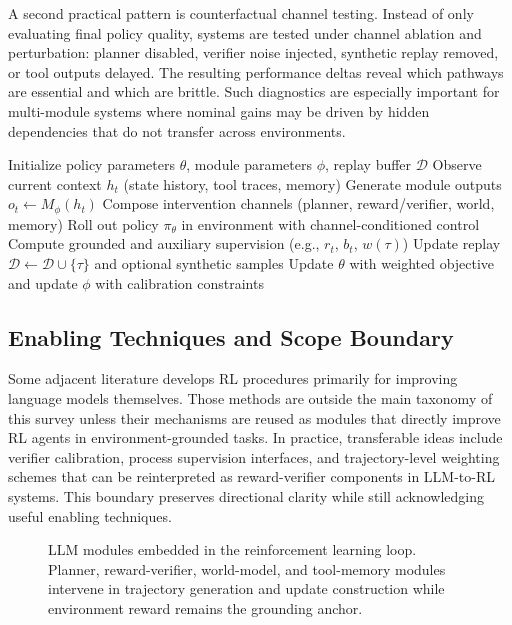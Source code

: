 \documentclass[pdflatex,sn-mathphys-num]{sn-jnl}
\begin{document}
A second practical pattern is counterfactual channel testing. Instead of only evaluating final policy quality, systems are tested under channel ablation and perturbation: planner disabled, verifier noise injected, synthetic replay removed, or tool outputs delayed. The resulting performance deltas reveal which pathways are essential and which are brittle. Such diagnostics are especially important for multi-module systems where nominal gains may be driven by hidden dependencies that do not transfer across environments.

\begin{algorithm}[t]
\caption{Generic LLM-Enhanced RL Loop}
\label{alg:generic_loop}
\begin{algorithmic}[1]
\State Initialize policy parameters $\theta$, module parameters $\phi$, replay buffer $\mathcal{D}$
  \State Observe current context $h_t$ (state history, tool traces, memory)
  \State Generate module outputs $o_t \leftarrow M_{\phi}(h_t)$
  \State Compose intervention channels (planner, reward/verifier, world, memory)
  \State Roll out policy $\pi_{\theta}$ in environment with channel-conditioned control
  \State Compute grounded and auxiliary supervision (e.g., $r_t$, $b_t$, $w(\tau)$)
  \State Update replay $\mathcal{D}\leftarrow \mathcal{D}\cup \{\tau\}$ and optional synthetic samples
  \State Update $\theta$ with weighted objective and update $\phi$ with calibration constraints
\EndFor
\end{algorithmic}
\end{algorithm}

\subsection{Enabling Techniques and Scope Boundary}
Some adjacent literature develops RL procedures primarily for improving language models themselves. Those methods are outside the main taxonomy of this survey unless their mechanisms are reused as modules that directly improve RL agents in environment-grounded tasks. In practice, transferable ideas include verifier calibration, process supervision interfaces, and trajectory-level weighting schemes that can be reinterpreted as reward-verifier components in LLM-to-RL systems. This boundary preserves directional clarity while still acknowledging useful enabling techniques.

\begin{figure}[t]
\centering

\caption{LLM modules embedded in the reinforcement learning loop. Planner, reward-verifier, world-model, and tool-memory modules intervene in trajectory generation and update construction while environment reward remains the grounding anchor.}
\label{fig:loop}
\end{figure}
\end{document}
